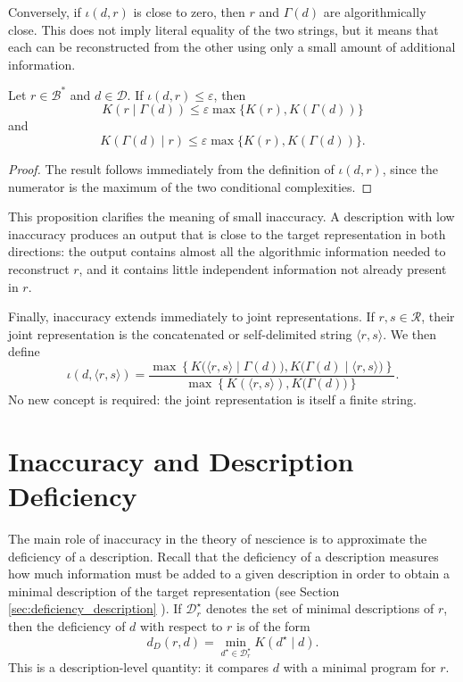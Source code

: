 Conversely, if $\iota(d,r)$ is close to zero, then $r$ and $\Gamma(d)$ are algorithmically close. This does not imply literal equality of the two strings, but it means that each can be reconstructed from the other using only a small amount of additional information.

\begin{proposition}
\label{prop:small_inaccuracy_algorithmic_closeness}
Let \(r \in \mathcal B^\ast\) and \(d \in \mathcal D\). If $\iota(d,r) \leq \varepsilon$, then
\[
K(r\mid \Gamma(d)) \leq \varepsilon \max\{K(r),K(\Gamma(d))\}
\]
and
\[
K(\Gamma(d)\mid r) \leq \varepsilon \max\{K(r),K(\Gamma(d))\}.
\]
\end{proposition}
\begin{proof}
The result follows immediately from the definition of $\iota(d,r)$, since the numerator is the maximum of the two conditional complexities.
\end{proof}

This proposition clarifies the meaning of small inaccuracy. A description with low inaccuracy produces an output that is close to the target representation in both directions: the output contains almost all the algorithmic information needed to reconstruct $r$, and it contains little independent information not already present in $r$.

Finally, inaccuracy extends immediately to joint representations. If $r,s \in \mathcal R$, their joint representation is the concatenated or self-delimited string $\langle r, s\rangle$. We then define
\[
\iota(d,\langle r,s\rangle) = \frac{ \max\left\{ K\bigl(\langle r,s\rangle\mid \Gamma(d)\bigr), K\bigl(\Gamma(d)\mid \langle r,s\rangle\bigr) \right\} }{
\max\left\{K(\langle r,s\rangle), K\bigl(\Gamma(d)\bigr) \right\}
}.
\]
No new concept is required: the joint representation is itself a finite string.

%
%

\section{Inaccuracy and Description Deficiency}
\label{sec:inaccuracy_deficiency_approximation}

The main role of inaccuracy in the theory of nescience is to approximate the deficiency of a description. Recall that the deficiency of a description measures how much information must be added to a given description in order to obtain a minimal description of the target representation (see Section \ref{sec:deficiency_description}
). If $\mathcal D_r^\star$ denotes the set of minimal descriptions of $r$, then the deficiency of $d$ with respect to $r$ is of the form
\[
d_D(r, d) = \min_{d^\star \in \mathcal D_r^\star} K(d^\star \mid d).
\]
This is a description-level quantity: it compares $d$ with a minimal program for $r$.

